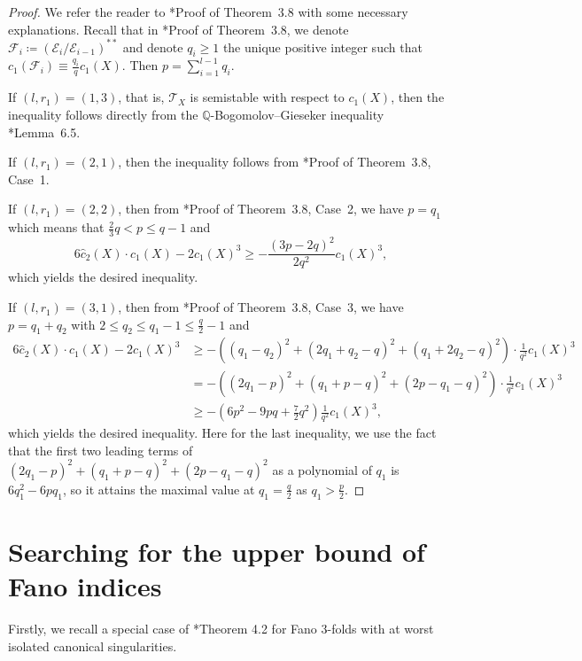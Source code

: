 \documentclass[12pt,twoside]{amsart}
\theoremstyle{definition}
\begin{document}
\begin{proof}
    We refer the reader to \cite{jiang-liu-liu}*{Proof of Theorem~3.8} with some necessary explanations. Recall that in \cite{jiang-liu-liu}*{Proof of Theorem~3.8}, we denote $\mathcal{F}_i\coloneqq (\mathcal{E}_i/\mathcal{E}_{i-1})^{**}$ and denote $q_i\geq 1$ the unique positive integer such that $c_1(\mathcal{F}_i)\equiv \frac{q_i}{q}c_1(X)$. Then $p=\sum_{i=1}^{l-1}q_i$. 
    
    If $(l, r_1)=(1,3)$, that is, $\mathcal{T}_X$ is semistable with respect to $c_1(X)$, then the inequality follows directly from the $\mathbb{Q}$-Bogomolov--Gieseker inequality \cite{KMM94}*{Lemma~6.5}.
    
    If $(l, r_1)=(2,1)$, then the inequality follows from \cite{jiang-liu-liu}*{Proof of Theorem~3.8, Case~1}.
    
    If $(l, r_1)=(2,2)$, then from \cite{jiang-liu-liu}*{Proof of Theorem~3.8, Case~2}, we have $p=q_1$ which means that $\frac23 q< p\leq q-1$ and
    \[
        6 \hat{c}_2(X)\cdot c_1(X) - 2c_1(X)^3 \geq -\frac{(3p-2q)^2}{2q^2} c_1(X)^3,
    \]
    which yields the desired inequality.
    
    If $(l, r_1)=(3,1)$, then from \cite{jiang-liu-liu}*{Proof of Theorem~3.8, Case~3}, we have $p=q_1+q_2$ with $2 \leq q_2 \leq q_1- 1 \leq \frac q2- 1$ and
    \begin{align*}
        6\hat{c}_2(X)\cdot c_1(X) - 2 c_1(X)^3 
        & \geq - \left((q_1-q_2)^2 + (2q_1+q_2-q)^2 + (q_1+2q_2-q)^2\right) \cdot \frac{1}{q^2} c_1(X)^3 \\
        & = - \left((2q_1-p)^2 + (q_1+p-q)^2 + (2p-q_1-q)^2\right) \cdot \frac{1}{q^2} c_1(X)^3 \\
        & \geq - \left(6 p^2 - 9pq + \frac{7}{2}q^2\right) \frac{1}{q^2} c_1(X)^3,
    \end{align*}
    which yields the desired inequality. Here for the last inequality, we use the fact that the first two leading terms of $ (2q_1-p)^2 + (q_1+p-q)^2 + (2p-q_1-q)^2$ as a polynomial of $q_1$ is $6q_1^2-6pq_1$, so it attains the maximal value at $q_1=\frac{q}{2}$ as $q_1>\frac{p}{2}$. 
\end{proof}


\section{Searching for the upper bound of Fano indices} 

Firstly, we recall a special case of \cite{jiang-liu-liu}*{Theorem 4.2} for Fano $3$-folds with at worst isolated canonical singularities.
\end{document}
